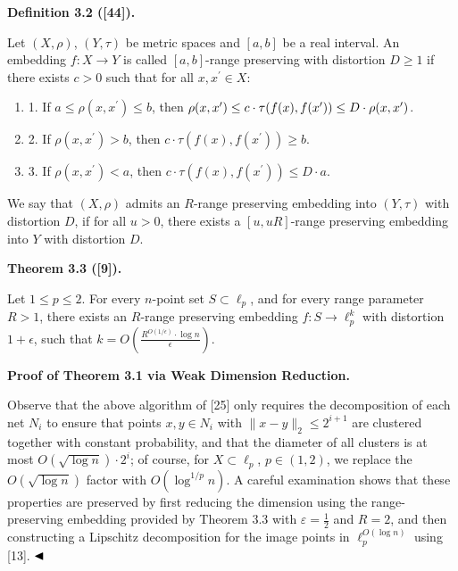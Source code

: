 \documentclass[10pt,a4paper]{amsart}
\begin{document}
\par
\par
\par\medskip\noindent\textbf{Definition 3.2 ([44]).}\par
Let $(X,\rho)$, $(Y,\tau)$ be metric spaces and $[a,b]$ be a real interval. An embedding $f:X\rightarrow Y$ is called $[a,b]$-range preserving with distortion $D\geq 1$  if there exists $c>0$ such that for all $x,x^{\prime}\in X$:
\par
\begin{enumerate}
\item  1. 
If $a\leq\rho(x,x^{\prime})\leq b$, then $\rho(x,x^{\prime})\leq c\cdot\tau(f(x),f(x^{\prime}))\leq D\cdot\rho(x,x^{%
\prime})$.
\par
\par
\item  2. 
If $\rho(x,x^{\prime})>b$, then $c\cdot\tau(f(x),f(x^{\prime}))\geq b$.
\par
\par
\item  3. 
If $\rho(x,x^{\prime})<a$, then $c\cdot\tau(f(x),f(x^{\prime}))\leq D\cdot a$.
\par
\par
\end{enumerate}
\par
\par
We say that $(X,\rho)$ admits an $R$-range preserving embedding into $(Y,\tau)$ with distortion $D$, if for all $u>0$, there exists a $[u,uR]$-range preserving embedding into $Y$ with distortion $D$.
\par
\par
\par\medskip\noindent\textbf{Theorem 3.3 ([9]).}\par
Let $1\leq p\leq 2$. For every $n$-point set $S\subset\ell_{p}$, and for every range parameter $R>1$, there exists an $R$-range preserving embedding $f:S\rightarrow\ell_{p}^{k}$ with distortion $1+\epsilon$, such that $k=O\left(\frac{R^{O(1/\epsilon)}\cdot\log n}{\epsilon}\right)$.
\par
\par
\par
\par
\par\medskip\noindent\textbf{Proof of Theorem 3.1 via Weak Dimension Reduction.}\par
Observe that the above algorithm of [25] only requires the decomposition of each net $N_{i}$ to ensure that points $x,y\in N_{i}$ with $\|x-y\|_{2}\leq 2^{i+1}$ are clustered together with constant probability, and that the diameter of all clusters is at most $O(\sqrt{\log{n}})\cdot 2^{i}$; of course, for $X\subset\ell_{p}$, $p\in(1,2)$, we replace the $O(\sqrt{\log{n}})$ factor with $O(\log^{1/p}{n})$. A careful examination shows that these properties are preserved by first reducing the dimension using the range-preserving embedding provided by Theorem 3.3 with $\varepsilon=\frac{1}{2}$ and $R=2$, and then constructing a Lipschitz decomposition for the image points in $\ell_{p}^{O(\log{n})}$ using [13]. $\hfill\blacktriangleleft$
\end{document}
